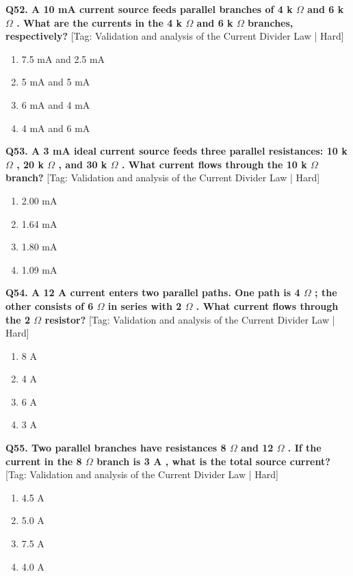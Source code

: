 \noindent\textbf{Q52. A 10 mA current source feeds parallel branches of 4 k $\Omega$ and 6 k $\Omega$ . What are the currents in the 4 k $\Omega$ and 6 k $\Omega$ branches, respectively?} \hfill [Tag: Validation and analysis of the Current Divider Law | Hard]
\begin{enumerate}[label=(\alph*),topsep=2pt,itemsep=1pt,partopsep=0pt,parsep=0pt]
    \item {7.5 mA and 2.5 mA}
    \item {5 mA and 5 mA}
    \item {6 mA and 4 mA}
    \item {4 mA and 6 mA}
\end{enumerate}
\vspace{2mm}

\noindent\textbf{Q53. A 3 mA ideal current source feeds three parallel resistances: 10 k $\Omega$ , 20 k $\Omega$ , and 30 k $\Omega$ . What current flows through the 10 k $\Omega$ branch?} \hfill [Tag: Validation and analysis of the Current Divider Law | Hard]
\begin{enumerate}[label=(\alph*),topsep=2pt,itemsep=1pt,partopsep=0pt,parsep=0pt]
    \item {2.00 mA}
    \item {1.64 mA}
    \item {1.80 mA}
    \item {1.09 mA}
\end{enumerate}
\vspace{2mm}

\noindent\textbf{Q54. A 12 A current enters two parallel paths. One path is 4 $\Omega$ ; the other consists of 6 $\Omega$ in series with 2 $\Omega$ . What current flows through the 2 $\Omega$ resistor?} \hfill [Tag: Validation and analysis of the Current Divider Law | Hard]
\begin{enumerate}[label=(\alph*),topsep=2pt,itemsep=1pt,partopsep=0pt,parsep=0pt]
    \item {8 A}
    \item {4 A}
    \item {6 A}
    \item {3 A}
\end{enumerate}
\vspace{2mm}

\noindent\textbf{Q55. Two parallel branches have resistances 8 $\Omega$ and 12 $\Omega$ . If the current in the 8 $\Omega$ branch is 3 A , what is the total source current?} \hfill [Tag: Validation and analysis of the Current Divider Law | Hard]
\begin{enumerate}[label=(\alph*),topsep=2pt,itemsep=1pt,partopsep=0pt,parsep=0pt]
    \item {4.5 A}
    \item {5.0 A}
    \item {7.5 A}
    \item {4.0 A}
\end{enumerate}
\vspace{2mm}

